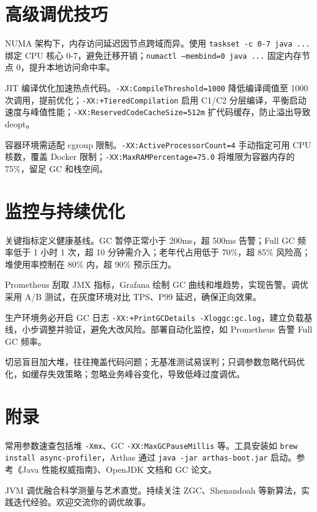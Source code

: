 \chapter{高级调优技巧}
NUMA 架构下，内存访问延迟因节点跨域而异。使用 \texttt{taskset -c 0-7 java ...} 绑定 CPU 核心 0-7，避免迁移开销；\texttt{numactl --membind=0 java ...} 固定内存节点 0，提升本地访问命中率。\par
JIT 编译优化加速热点代码。\texttt{-XX:CompileThreshold=1000} 降低编译阈值至 1000 次调用，提前优化；\texttt{-XX:+TieredCompilation} 启用 C1/C2 分层编译，平衡启动速度与峰值性能；\texttt{-XX:ReservedCodeCacheSize=512m} 扩代码缓存，防止溢出导致 deopt。\par
容器环境需适配 cgroup 限制。\texttt{-XX:ActiveProcessorCount=4} 手动指定可用 CPU 核数，覆盖 Docker 限制；\texttt{-XX:MaxRAMPercentage=75.0} 将堆限为容器内存的 75\%{}，留足 GC 和栈空间。\par
\chapter{监控与持续优化}
关键指标定义健康基线。GC 暂停正常小于 200ms，超 500ms 告警；Full GC 频率低于 1 小时 1 次，超 10 分钟需介入；老年代占用低于 70\%{}，超 85\%{} 风险高；堆使用率控制在 80\%{} 内，超 90\%{} 预示压力。\par
Prometheus 刮取 JMX 指标，Grafana 绘制 GC 曲线和堆趋势，实现告警。调优采用 A/B 测试，在灰度环境对比 TPS、P99 延迟，确保正向效果。\par
生产环境务必开启 GC 日志 \texttt{-XX:+PrintGCDetails -Xloggc:gc.log}，建立负载基线，小步调整并验证，避免大改风险。部署自动化监控，如 Prometheus 告警 Full GC 频率。\par
切忌盲目加大堆，往往掩盖代码问题；无基准测试易误判；只调参数忽略代码优化，如缓存失效策略；忽略业务峰谷变化，导致低峰过度调优。\par
\chapter{附录}
常用参数速查包括堆 \texttt{-Xmx}、GC \texttt{-XX:MaxGCPauseMillis} 等。工具安装如 \texttt{brew install async-profiler}，Arthas 通过 \texttt{java -jar arthas-boot.jar} 启动。参考《Java 性能权威指南》、OpenJDK 文档和 GC 论文。\par
JVM 调优融合科学测量与艺术直觉。持续关注 ZGC、Shenandoah 等新算法，实践迭代经验。欢迎交流你的调优故事。\par
